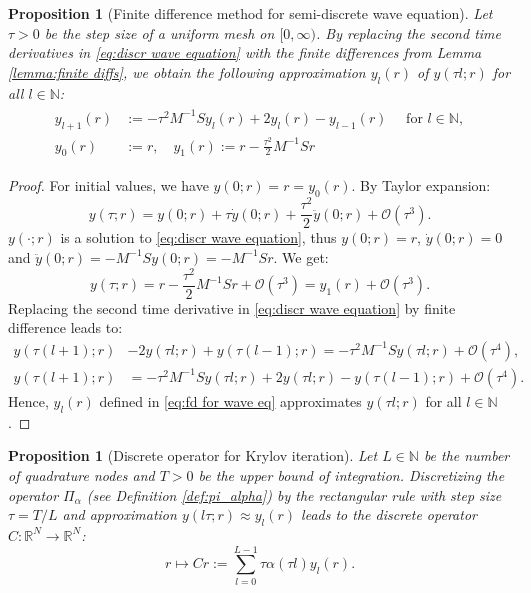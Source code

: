 \documentclass[a4paper,11pt,bibliography=totoc,listof=totoc,headinclude=true,cleardoublepage=empty,oneside]{scrbook}
\newtheorem{prop}[theorem]{Proposition}
\newcommand{\R}{\mathbb{R}}
\newcommand{\N}{\mathbb{N}}
\newcommand{\bigO}{\mathcal{O}}
\begin{document}
\begin{prop}[Finite difference method for semi-discrete wave equation]
    Let $\tau>0$ be the step size of a uniform mesh on $[0, \infty)$. By replacing the second time derivatives in \eqref{eq:discr wave equation} with the finite differences from Lemma \ref{lemma:finite diffs}, we obtain the following approximation $y_l(r)$ of $y(\tau l; r)$ for all $l \in \N$:
    \begin{align}\label{eq:fd for wave eq}
    \begin{split}
        y_{l+1}(r) &:= -\tau^2M^{-1}S y_l(r) + 2y_l(r) - y_{l-1}(r) \quad \text{ for } l \in \N, \\
        y_0(r) &:= r, \quad y_1(r) := r - \frac{\tau^2}{2}M^{-1}Sr
    \end{split}
    \end{align}
\end{prop}
\begin{proof}
    For initial values, we have $y(0; r) = r = y_0(r)$. By Taylor expansion:
    \begin{equation*}
        y(\tau; r) = y(0; r) + \tau \dot{y}(0; r) + \frac{\tau^2}{2} \ddot{y}(0; r) + \bigO(\tau^3) .
    \end{equation*} 
    $y(\cdot; r)$ is a solution to \eqref{eq:discr wave equation}, thus $y(0; r) = r$, $\dot{y}(0; r) = 0$ and $\ddot{y}(0; r) = -M^{-1}Sy(0; r) = -M^{-1}Sr$. We get:
    \begin{equation*}
        y(\tau; r) = r - \frac{\tau^2}{2} M^{-1}Sr + \bigO(\tau^3) = y_{1}(r) + \bigO(\tau^3).
    \end{equation*}
    Replacing the second time derivative in \eqref{eq:discr wave equation} by finite difference leads to:
    \begin{align*}
        y(\tau(l+1); r) &- 2 y(\tau l; r) + y(\tau(l-1); r) = -\tau^2 M^{-1}S y(\tau l; r) + \bigO(\tau^4), \\
        y(\tau(l+1); r) &= -\tau^2 M^{-1}S y(\tau l; r) + 2y(\tau l; r) - y(\tau (l-1); r) + \bigO(\tau^4).
    \end{align*}
    Hence, $y_l(r)$ defined in \eqref{eq:fd for wave eq} approximates $y(\tau l; r)$ for all $l \in \N$.
\end{proof}

\begin{prop}[Discrete operator for Krylov iteration]\label{prop:C operator}
    Let $L \in \N$ be the number of quadrature nodes and $T>0$ be the upper bound of integration. Discretizing the operator $\Pi_\alpha$ (see Definition \ref{def:pi_alpha}) by the rectangular rule with step size $\tau = T/L$ and approximation $y(l\tau; r) \approx y_l(r)$ leads to the discrete operator $C : \R^N \rightarrow \R^N$:
    \begin{equation}\label{eq:C operator}
        r \mapsto Cr := \sum_{l=0}^{L-1} \tau \alpha(\tau l) y_l(r).
    \end{equation}
\end{prop}
\end{document}
